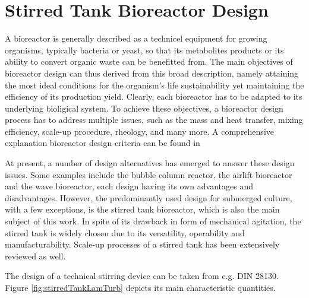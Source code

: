 \section{Stirred Tank Bioreactor Design}

A bioreactor is generally described as a technicel equipment for growing organisms, typically bacteria or yeast, so that its metabolites products or its ability to convert organic waste can be benefitted from. The main objectives of bioreactor design can thus derived from this broad description, namely attaining the most ideal conditions for the organism's life sustainability yet maintaining the efficiency of its production yield. Clearly, each bioreactor has to be adapted to its underlying bioligical system. To achieve these objectives, a bioreactor design process has to address multiple issues, such as the mass and heat transfer, mixing efficiency, scale-up procedure, rheology, and many more. A comprehensive explanation bioreactor design criteria can be found in \citet{Mandenius2016}

At present, a number of design alternatives has emerged to answer these design issues. Some examples include the bubble column reactor, the airlift bioreactor and the wave bioreactor, each design having its own advantages and disadvantages. However, the predominantly used design for submerged culture, with a few exceptions, is the stirred tank bioreactor, which is also the main subject of this work. In spite of its drawback in form of mechanical agitation, the stirred tank is widely chosen due to its versatility, operability and manufacturability. Scale-up processes of a stirred tank has been extensively reviewed as well.

The design of a technical stirring device can be taken from e.g. DIN 28130. Figure \ref{fig:stirredTankLamTurb} depicts its main characteristic quantities.



